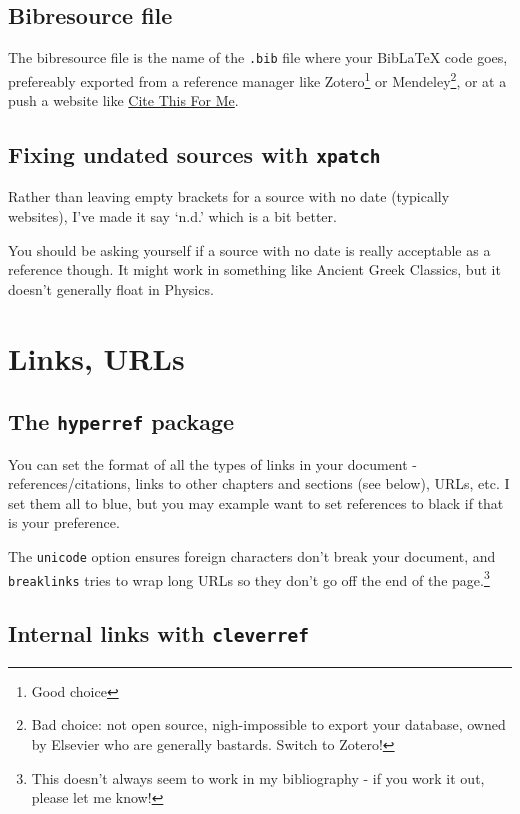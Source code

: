 \documentclass[../main]{subfiles}
\begin{document}
\subsection{Bibresource file}

The bibresource file is the name of the \texttt{.bib} file where your BibLaTeX code goes, prefereably exported from a reference manager like Zotero\footnote{Good choice} or Mendeley\footnote{Bad choice: not open source, nigh-impossible to export your database, owned by Elsevier who are generally bastards. Switch to Zotero!}, or at a push a website like \href{https://www.citethisforme.com/}{Cite This For Me}. 

\subsection{Fixing undated sources with \texttt{xpatch}}

Rather than leaving empty brackets for a source with no date (typically websites), I've made it say `n.d.' which is a bit better.

You should be asking yourself if a source with no date is really acceptable as a reference though. It might work in something like Ancient Greek Classics, but it doesn't generally float in Physics.

\section{Links, URLs}

\subsection{The \texttt{hyperref} package}

You can set the format of all the types of links in your document - references/citations, links to other chapters and sections (see below), URLs, etc. I set them all to blue, but you may example want to set references to black if that is your preference.

The \texttt{unicode} option ensures foreign characters don't break your document, and \texttt{breaklinks} tries to wrap long URLs so they don't go off the end of the page.\footnote{This doesn't always seem to work in my bibliography - if you work it out, please let me know!}

\subsection{Internal links with \texttt{cleverref}}
\end{document}
